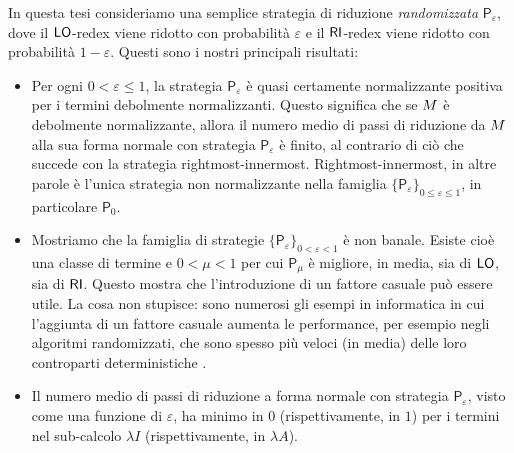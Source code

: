 In questa tesi consideriamo una semplice strategia di riduzione \emph{randomizzata}
$\mathsf{P}_\varepsilon$, dove il $\textsf{LO}$-redex
viene ridotto con probabilità $\varepsilon$ e il $\textsf{RI}$-redex viene
ridotto con probabilità $1-\varepsilon$. Questi sono i nostri principali risultati:
\begin{itemize}
	\item
	Per ogni $0<\varepsilon\leq 1$, la strategia
	$\mathsf{P}_\varepsilon$ è quasi certamente normalizzante positiva per i
	termini debolmente normalizzanti. Questo significa che se $M$ è
	debolmente normalizzante, allora il numero medio di passi di riduzione da
	$M$ alla sua forma normale con strategia $\mathsf{P}_\varepsilon$
	è finito, al contrario di ciò che succede con la strategia rightmost-innermost.
	Rightmost-innermost, in altre parole è l'unica strategia non normalizzante nella famiglia
	$\{\mathsf{P}_\varepsilon\}_{0\leq\varepsilon\leq 1}$, in particolare $\mathsf{P}_0$.
	\item
	Mostriamo che la famiglia di strategie
	$\{\mathsf{P}_\varepsilon\}_{0<\varepsilon<1}$ è non banale.
	Esiste cioè una classe di termine e
	$0<\mu<1$ per cui $\mathsf{P}_\mu$ è migliore, in media, sia di
	$\textsf{LO}$, sia di $\textsf{RI}$. Questo mostra che l'introduzione di un fattore casuale può essere
	utile. La cosa non stupisce:
	sono numerosi gli esempi in informatica in cui l'aggiunta di un fattore casuale aumenta
	le performance, per esempio negli algoritmi randomizzati, che sono spesso più veloci
	(in media) delle loro controparti deterministiche
	\cite{motwani_randomized_1995}.
	\item
	Il numero medio di passi di riduzione a forma normale con strategia
	$\mathsf{P}_\varepsilon$, visto come una funzione di
	$\varepsilon$, ha minimo in $0$ (rispettivamente, in $1$) per i termini nel sub-calcolo
	$\lambda I$ (rispettivamente, in $\lambda A$).
\end{itemize}

\endgroup

